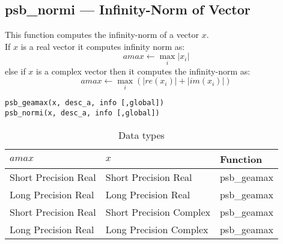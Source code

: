\clearpage\subsection*{psb\_normi --- Infinity-Norm of Vector}

This function computes 
 the infinity-norm of a vector $x$.\\
If $x$ is a real  vector
it computes infinity norm as:
\[ amax \leftarrow \max_i |x_i|\]
else if $x$ is a complex vector then it computes the infinity-norm  as:
\[ amax \leftarrow \max_i {(|re(x_i)| + |im(x_i)|)}\]

\begin{verbatim}
psb_geamax(x, desc_a, info [,global])
psb_normi(x, desc_a, info [,global])
\end{verbatim}

\begin{table}[h]
\begin{center}
\begin{tabular}{lll}
\hline
$amax$ & $x$ & {\bf Function}\\
\hline
Short Precision Real& Short Precision Real & psb\_geamax \\
Long Precision Real&Long Precision Real & psb\_geamax \\
Short Precision Real&Short Precision Complex & psb\_geamax \\
Long Precision Real&Long Precision Complex & psb\_geamax \\
\hline
\end{tabular}
\end{center}
\caption{Data types\label{tab:f90amax}}
\end{table}


